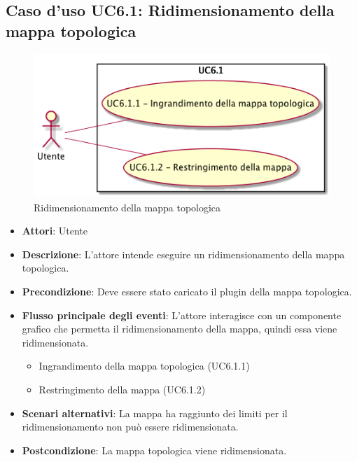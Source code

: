 \subsection{Caso d'uso UC6.1: Ridimensionamento della mappa topologica}
\begin{figure} [H]
\centering
\includegraphics[scale=0.45]{./UC/UC6-1.png}
\caption{Ridimensionamento della mappa topologica}\label{}
\end{figure}
\begin{itemize}
\item \textbf{Attori}: Utente
\item \textbf{Descrizione}: L'attore intende eseguire un ridimensionamento della mappa topologica. 
\item \textbf{Precondizione}: Deve essere stato caricato il plugin della mappa topologica.
\item \textbf{Flusso principale degli eventi}: L'attore interagisce con un componente grafico che permetta il ridimensionamento della mappa, quindi essa viene ridimensionata.
\begin{itemize}
\item Ingrandimento della mappa topologica (UC6.1.1)
\item Restringimento della mappa (UC6.1.2)
\end{itemize}
\item \textbf{Scenari alternativi}: La mappa ha raggiunto dei limiti per il ridimensionamento non può essere ridimensionata.
\item \textbf{Postcondizione}: La mappa topologica viene ridimensionata. 
\end{itemize}
